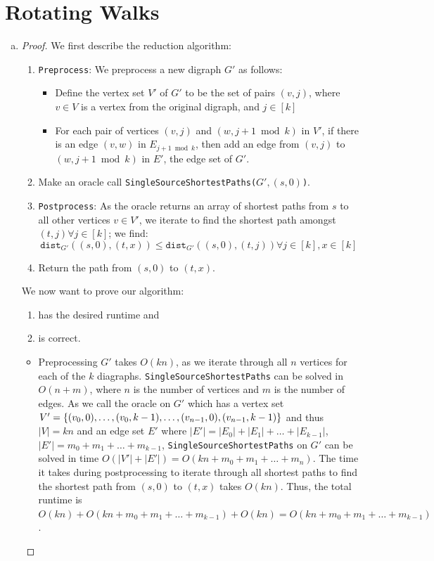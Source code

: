\documentclass[11pt]{scrartcl}
\theoremstyle{dotlessP}
\theoremstyle{dotlessN}
\DeclarePairedDelimiter\set{\{}{\}}
\begin{document}
\section{Rotating Walks}
\begin{enumerate}[(a)]
	\item \begin{proof}
	We first describe the reduction algorithm:
	\begin{enumerate}
		\item \texttt{Preprocess}: We preprocess a new digraph $G'$ as follows:
			\begin{itemize}
				\item Define the vertex set $V'$ of $G'$ to be the set of pairs $(v, j)$, where $v \in V$ is a vertex from the original digraph, and $j \in [k]$	
				\item For each pair of vertices $(v, j)$ and $(w, j+1 \bmod k)$ in $V'$, if there is an edge $(v, w)$ in $E_{j+1 \bmod k}$, then add an edge from $(v, j)$ to $(w, j+1 \bmod k)$ in $E'$, the edge set of $G'$.
			\end{itemize}
		\item Make an oracle call \texttt{SingleSourceShortestPaths($G',(s, 0)$)}.
		\item \texttt{Postprocess}: As the oracle returns an array of shortest paths from $s$ to all other vertices  $v \in V'$, we iterate to find the shortest path amongst $(t,j) \forall j \in [k]$; we find:
			\[
				\texttt{dist}_{G'}((s,0), (t,x)) \leq \texttt{dist}_{G'}((s,0), (t,j)) \forall j \in [k], x \in [k]
			\] 
		\item Return the path from $(s,0)$ to  $(t,x)$.
	\end{enumerate}
	We now want to prove our algorithm:
	\begin{enumerate}
		\item has the desired runtime and
		\item is correct.
	\end{enumerate}
	\begin{itemize}
		\item Preprocessing $G'$ takes $O(kn)$, as we iterate through all $n$ vertices for each of the $k$ diagraphs. \texttt{SingleSourceShortestPaths} can be solved in $O(n + m)$, where $n$ is the number of vertices and $m$ is the number of edges. As we call the oracle on  $G'$ which has a vertex set $V' = \set*{(v_0, 0), \dots, (v_0, k-1), \dots, (v_{n-1}, 0), (v_{n-1}, k-1)}$ and thus $|V| = kn$ and an edge set $E'$ where $|E'| = |E_0| + |E_1| + \dots + |E_{k-1}|$, $|E'| = m_0 + m_1 + \dots + m_{k-1}$, \texttt{SingleSourceShortestPaths} on $G'$ can be solved in time $O(|V'| + |E'|) = O(kn + m_0 + m_1 + \dots + m_n)$. The time it takes during postprocessing to iterate through all shortest paths to find the shortest path from $(s,0)$ to  $(t,x)$ takes  $O(kn)$. Thus, the total runtime is  $O(kn) + O(kn + m_0 + m_1 + \dots + m_{k-1}) + O(kn) = O(kn + m_0 + m_1 + \dots + m_{k-1})$. 

\end{itemize}
\end{proof}
\end{enumerate}
\end{document}
